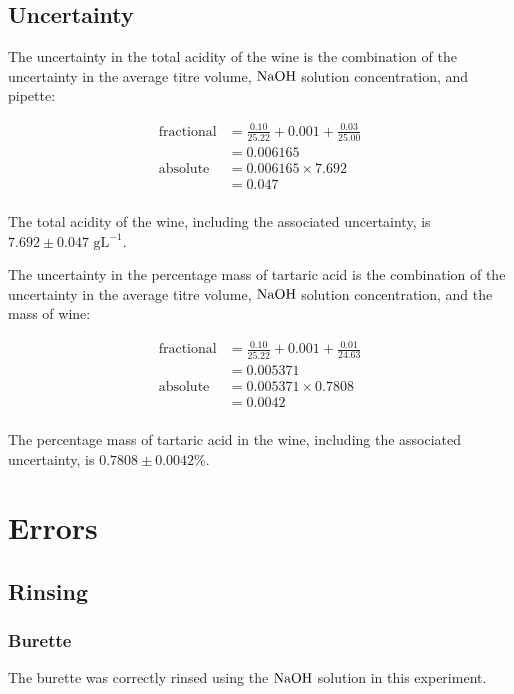 \documentclass[a4paper,11pt]{article}
\begin{document}
\subsection{Uncertainty}

The uncertainty in the total acidity of the wine is the combination of the
uncertainty in the average titre volume, $\ce{NaOH}$ solution concentration,
and pipette:

$$
\begin{aligned}
\mbox{fractional} & = \frac{0.10}{25.22} + 0.001 + \frac{0.03}{25.00} \\
& = 0.006165 \\
\mbox{absolute} & = 0.006165 \times 7.692 \\
& = 0.047 \\
\end{aligned}
$$

The total acidity of the wine, including the associated uncertainty, is
$7.692 \pm 0.047\mbox{ gL}^{-1}$.

The uncertainty in the percentage mass of tartaric acid is the combination of
the uncertainty in the average titre volume, $\ce{NaOH}$ solution concentration,
and the mass of wine:

$$
\begin{aligned}
\mbox{fractional} & = \frac{0.10}{25.22} + 0.001 + \frac{0.01}{24.63} \\
& = 0.005371 \\
\mbox{absolute} & = 0.005371 \times 0.7808 \\
& = 0.0042 \\
\end{aligned}
$$

The percentage mass of tartaric acid in the wine, including the associated
uncertainty, is $0.7808 \pm 0.0042\%$.


\section{Errors}

\subsection{Rinsing}

\subsubsection{Burette}

The burette was correctly rinsed using the $\ce{NaOH}$ solution in this
experiment.
\end{document}
